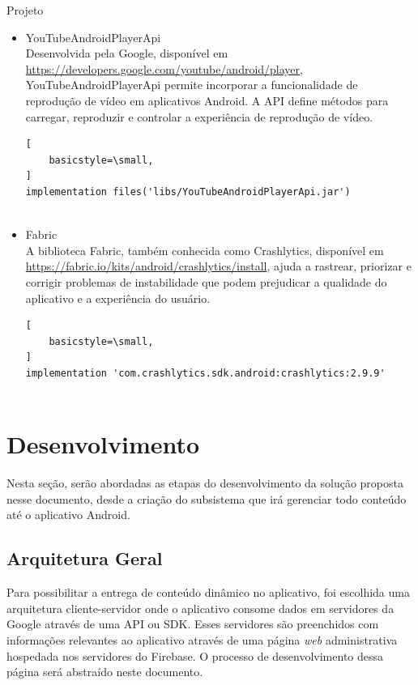 \documentclass[
	12pt,				%
	openany,			%
	twoside,			%
	a4paper,			%
	english,			%
	french,				%
	spanish,			%
	brazil				%
	]{abntex2}
\begin{document}
\begin{chapter}{Projeto}
\begin{itemize}
\begin{lstlisting}[
    basicstyle=\small,
]
\end{lstlisting}
\item{YouTubeAndroidPlayerApi} \\
   Desenvolvida pela Google, disponível em \url{https://developers.google.com/youtube/android/player}, YouTubeAndroidPlayerApi permite incorporar a funcionalidade de reprodução de vídeo em aplicativos Android. A API  define métodos para carregar, reproduzir 
e controlar a experiência de reprodução de vídeo.
      \begin{lstlisting}[
    basicstyle=\small,
]
implementation files('libs/YouTubeAndroidPlayerApi.jar')
   
\end{lstlisting}
\item{Fabric} \\
   A biblioteca Fabric, também conhecida como Crashlytics, disponível em \url{https://fabric.io/kits/android/crashlytics/install}, ajuda a rastrear, priorizar e corrigir problemas de instabilidade que podem prejudicar a qualidade do aplicativo e a experiência do usuário.
   \begin{lstlisting}[
    basicstyle=\small,
]
implementation 'com.crashlytics.sdk.android:crashlytics:2.9.9'
   
\end{lstlisting}
\end{itemize}

\section{Desenvolvimento}
Nesta seção, serão abordadas as etapas do desenvolvimento da solução proposta nesse documento, desde a criação do subsistema que irá gerenciar todo conteúdo até o aplicativo Android. 

\subsection{Arquitetura Geral}
Para possibilitar a entrega de conteúdo dinâmico no aplicativo, foi escolhida uma arquitetura cliente-servidor onde o aplicativo consome dados em servidores da Google através de uma API ou SDK. Esses servidores são preenchidos com informações relevantes ao aplicativo através de uma página \textit{web} administrativa hospedada nos servidores do Firebase. O processo de desenvolvimento dessa página será abstraído neste documento.\\



\end{chapter}
\end{document}
